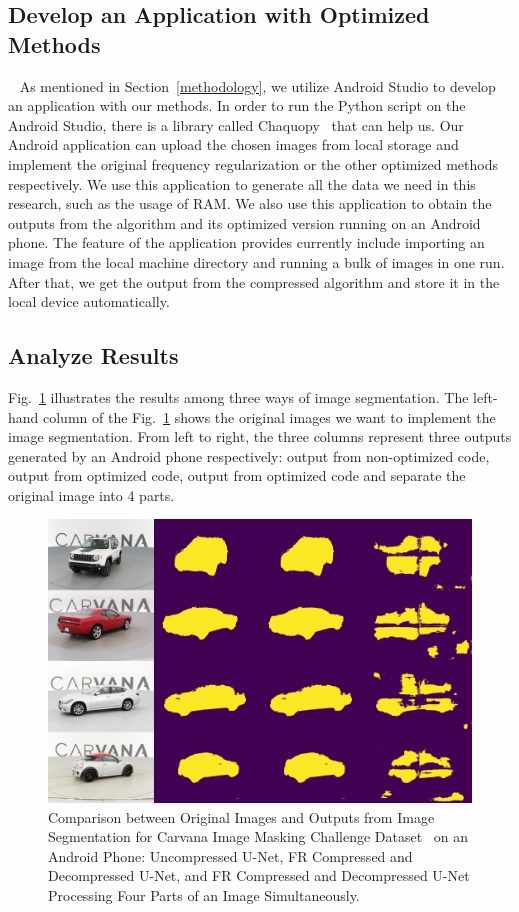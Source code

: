 \documentclass[runningheads]{llncs}
\begin{document}
\subsection{Develop an Application with Optimized Methods}~\label{deploy_as}
As mentioned in Section~\ref{methodology}, we utilize Android Studio to develop an application with our methods. In order to run the Python script on the Android Studio, there is a library called Chaquopy~\cite{chaquopy2023} that can help us. Our Android application can upload the chosen images from local storage and implement the original frequency regularization or the other optimized methods respectively. We use this application to generate all the data we need in this research, such as the usage of RAM. We also use this application to obtain the outputs from the algorithm and its optimized version running on an Android phone. The feature of the application provides currently include importing an image from the local machine directory and running a bulk of images in one run. After that, we get the output from the compressed algorithm and store it in the local device automatically.

\subsection{Analyze Results}
Fig.~\ref{image:3_outputs} illustrates the results among three ways of image segmentation. The left-hand column of the Fig.~\ref{image:3_outputs} shows the original images we want to implement the image segmentation. From left to right, the three columns represent three outputs generated by an Android phone respectively: output from non-optimized code, output from optimized code, output from optimized code and separate the original image into 4 parts. 
\begin{figure}[htbp]
	\centering
	\label{image:3_outputs}
	\includegraphics[width=0.8\linewidth]{figures/3_outputs.png}
	\caption{Comparison between Original Images and Outputs from Image Segmentation for Carvana Image Masking Challenge Dataset~\cite{brian2017carvanadataset} on an Android Phone: Uncompressed U-Net, FR Compressed and Decompressed U-Net, and FR Compressed and Decompressed U-Net Processing Four Parts of an Image Simultaneously.}
\end{figure}
\end{document}

